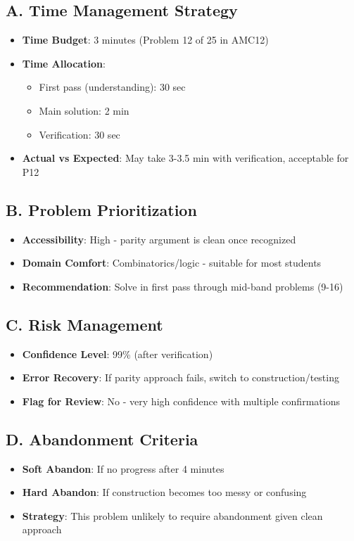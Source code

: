 \documentclass[11pt]{article}
\begin{document}
\begin{competitionbox}
\subsection*{A. Time Management Strategy}
\begin{itemize}[leftmargin=*]
    \item \textbf{Time Budget}: 3 minutes (Problem 12 of 25 in AMC12)
    \item \textbf{Time Allocation}:
    \begin{itemize}
        \item First pass (understanding): 30 sec
        \item Main solution: 2 min
        \item Verification: 30 sec
    \end{itemize}
    \item \textbf{Actual vs Expected}: May take 3-3.5 min with verification, acceptable for P12
\end{itemize}

\subsection*{B. Problem Prioritization}
\begin{itemize}[leftmargin=*]
    \item \textbf{Accessibility}: High - parity argument is clean once recognized
    \item \textbf{Domain Comfort}: Combinatorics/logic - suitable for most students
    \item \textbf{Recommendation}: Solve in first pass through mid-band problems (9-16)
\end{itemize}

\subsection*{C. Risk Management}
\begin{itemize}[leftmargin=*]
    \item \textbf{Confidence Level}: 99\% (after verification)
    \item \textbf{Error Recovery}: If parity approach fails, switch to construction/testing
    \item \textbf{Flag for Review}: No - very high confidence with multiple confirmations
\end{itemize}

\subsection*{D. Abandonment Criteria}
\begin{itemize}[leftmargin=*]
    \item \textbf{Soft Abandon}: If no progress after 4 minutes
    \item \textbf{Hard Abandon}: If construction becomes too messy or confusing
    \item \textbf{Strategy}: This problem unlikely to require abandonment given clean approach
\end{itemize}


\end{competitionbox}
\end{document}
